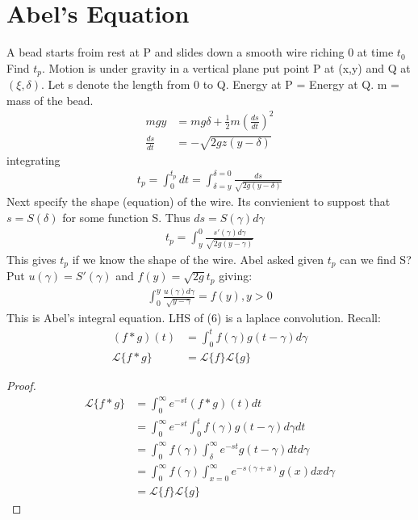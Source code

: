 \documentclass[10pt, oneside]{article}
\begin{document}
\section{Abel's Equation}
A bead starts froim rest at P and slides down a smooth wire riching 0 at time $t_{0}$ Find $t_{p}$. Motion is under gravity in a vertical plane put point P at (x,y) and Q at $(\xi,\delta)$. Let s denote the length from 0 to Q. Energy at P = Energy at Q. m = mass of the bead. 
\begin{align*}
    mgy &= mg\delta+\frac{1}{2} m (\frac{ds}{dt})^{2}\\
    \frac{ds}{dt} &= -\sqrt{2gz(y-\delta)}
\end{align*}
integrating 
\begin{align*}
    t_p = \int_{0}^{t_p}dt= \int_{\delta=y}^{\delta=0} \frac{ds}{\sqrt{2g(y-\delta)}} 
\end{align*}
Next specify the shape (equation) of the wire. Its convienient to suppost that $s=S(\delta)$ for some function S. Thus $ds = S(\gamma)d\gamma$
\begin{align*}
    t_p = \int_{y}^{0} \frac{s'(\gamma)d\gamma}{\sqrt{2g(y-\gamma)}} 
\end{align*}
This gives $t_p$ if we know the shape of the wire. Abel asked given $t_p$ can we find S? 
Put $u(\gamma) = S'(\gamma)$ and $f(y) = \sqrt{2g}t_{p}$ giving:
\begin{align}
    \int_{0}^{y}\frac{u(\gamma)d\gamma}{\sqrt{y-\gamma}} = f(y), y>0
\end{align}
This is Abel's integral equation. LHS of (6) is a laplace convolution. Recall:
\begin{align*}
    (f*g)(t) &= \int_{0}^{t}f(\gamma)g(t-\gamma)d\gamma \\
    \mathscr{L}\{f*g\} & = \mathscr{L}\{f\} \mathscr{L}\{g\}
\end{align*}
\begin{proof}
    \begin{align*}
        \mathscr{L}\{f*g\} &= \int_{0}^{\infty}e^{-st} (f*g)(t)dt \\
        & = \int_{0}^{\infty}e^{-st}\int_{0}^{t}f(\gamma)g(t-\gamma)d\gamma dt\\
        & = \int_{0}^{\infty}f(\gamma)\int_{\delta}^{\infty}e^{-st} g(t-\gamma)dtd\gamma\\
        & = \int_{0}^{\infty}f(\gamma)\int_{x=0}^{\infty}e^{-s(\gamma + x)}g(x)dxd\gamma\\
        & = \mathscr{L}\{f\} \mathscr{L}\{g\} 
    \end{align*}
\end{proof}
\end{document}
